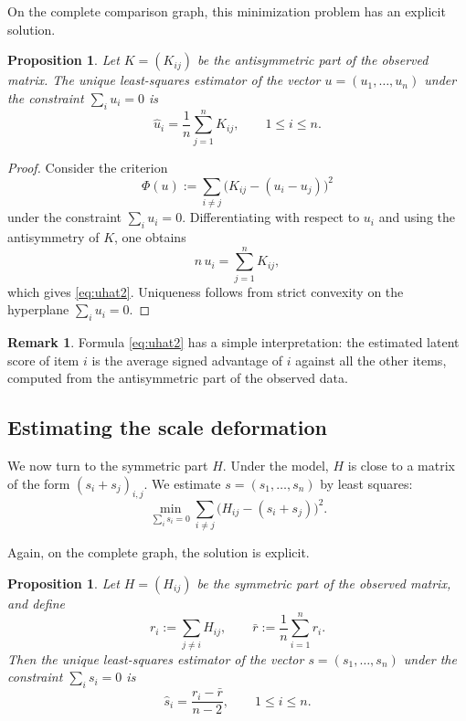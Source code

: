 \documentclass[11pt]{amsart}
\theoremstyle{definition}
\newtheorem{remark}[definition]{Remark}
\theoremstyle{plain}
\newtheorem{proposition}[definition]{Proposition}
\numberwithin{equation}{section}
\begin{document}
On the complete comparison graph, this minimization problem has an explicit solution.

\begin{proposition}
Let $K=(K_{ij})$ be the antisymmetric part of the observed matrix. The unique least-squares estimator of the vector $u=(u_1,\dots,u_n)$ under the constraint $\sum_i u_i=0$ is
\begin{equation}\label{eq:uhat2}
\widehat u_i=\frac1n\sum_{j=1}^n K_{ij},
\qquad 1\le i\le n.
\end{equation}
\end{proposition}

\begin{proof}
Consider the criterion
\[
\Phi(u):=\sum_{i\neq j}\bigl(K_{ij}-(u_i-u_j)\bigr)^2
\]
under the constraint $\sum_i u_i=0$. Differentiating with respect to $u_i$ and using the antisymmetry of $K$, one obtains
\[
n\,u_i=\sum_{j=1}^n K_{ij},
\]
which gives \eqref{eq:uhat2}. Uniqueness follows from strict convexity on the hyperplane $\sum_i u_i=0$.
\end{proof}

\begin{remark}
Formula \eqref{eq:uhat2} has a simple interpretation: the estimated latent score of item $i$ is the average signed advantage of $i$ against all the other items, computed from the antisymmetric part of the observed data.
\end{remark}

\subsection{Estimating the scale deformation}

We now turn to the symmetric part $H$. Under the model, $H$ is close to a matrix of the form
\(
(s_i+s_j)_{i,j}.
\)
We estimate $s=(s_1,\dots,s_n)$ by least squares:
\[
\min_{\sum_i s_i=0}
\sum_{i\neq j}\bigl(H_{ij}-(s_i+s_j)\bigr)^2.
\]

Again, on the complete graph, the solution is explicit.

\begin{proposition}
Let $H=(H_{ij})$ be the symmetric part of the observed matrix, and define
\[
r_i:=\sum_{j\neq i}H_{ij},
\qquad
\bar r:=\frac1n\sum_{i=1}^n r_i.
\]
Then the unique least-squares estimator of the vector $s=(s_1,\dots,s_n)$ under the constraint $\sum_i s_i=0$ is
\begin{equation}\label{eq:shat2}
\widehat s_i=\frac{r_i-\bar r}{n-2},
\qquad 1\le i\le n.
\end{equation}
\end{proposition}
\end{document}
